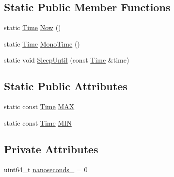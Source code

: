 \subsection*{Static Public Member Functions}
\begin{DoxyCompactItemize}
\item 
static \hyperlink{classapollo_1_1cyber_1_1Time}{Time} \hyperlink{classapollo_1_1cyber_1_1Time_ae99205967a9827bf059bc0e6e32dedd4}{Now} ()
\item 
static \hyperlink{classapollo_1_1cyber_1_1Time}{Time} \hyperlink{classapollo_1_1cyber_1_1Time_abb3f07caa00e1e76d3040e9f725afc09}{Mono\-Time} ()
\item 
static void \hyperlink{classapollo_1_1cyber_1_1Time_a255a68cd7d7f16943070afed170cd047}{Sleep\-Until} (const \hyperlink{classapollo_1_1cyber_1_1Time}{Time} \&time)
\end{DoxyCompactItemize}
\subsection*{Static Public Attributes}
\begin{DoxyCompactItemize}
\item 
static const \hyperlink{classapollo_1_1cyber_1_1Time}{Time} \hyperlink{classapollo_1_1cyber_1_1Time_a4e28a6f1efbcc5b08154423e6ce88514}{M\-A\-X}
\item 
static const \hyperlink{classapollo_1_1cyber_1_1Time}{Time} \hyperlink{classapollo_1_1cyber_1_1Time_aa84c8bb7deb9dc66d7b2386dae6fbc1b}{M\-I\-N}
\end{DoxyCompactItemize}
\subsection*{Private Attributes}
\begin{DoxyCompactItemize}
\item 
uint64\-\_\-t \hyperlink{classapollo_1_1cyber_1_1Time_a04a6ad56a17f2b1bb2958d9ee9f32552}{nanoseconds\-\_\-} = 0
\end{DoxyCompactItemize}


